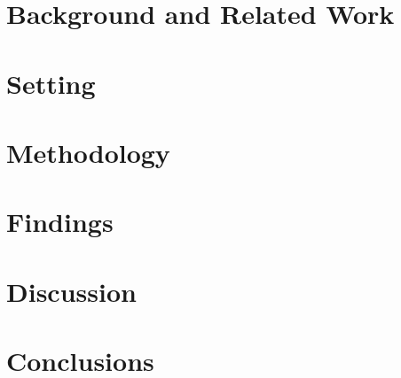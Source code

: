 \section{Background and Related Work}
\section{Setting}
\section{Methodology}
\section{Findings}
\section{Discussion}
\section{Conclusions}
